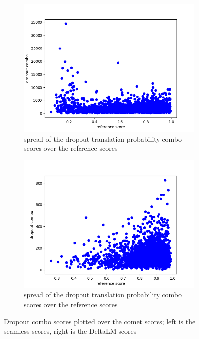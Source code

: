 \begin{figure}[ht]
        \centering%
    \begin{subfigure}{0.4\linewidth}
        \includegraphics[width=\textwidth]{Latex/sections/images/seamlessdropoutcombo.png}
        \caption{spread of the dropout translation probability combo scores over the reference scores}
    \end{subfigure}
    \begin{subfigure}{0.4\linewidth}
        \includegraphics[width=\textwidth]{Latex/sections/images/dlmdropoutcombo.png}
        \caption{spread of the dropout translation probability combo scores over the reference scores}
    \end{subfigure}
    \caption{Dropout combo scores plotted over the comet scores; left is the seamless scores, right is the DeltaLM scores}
    \label{fig:dropout translation combo}
\end{figure}

